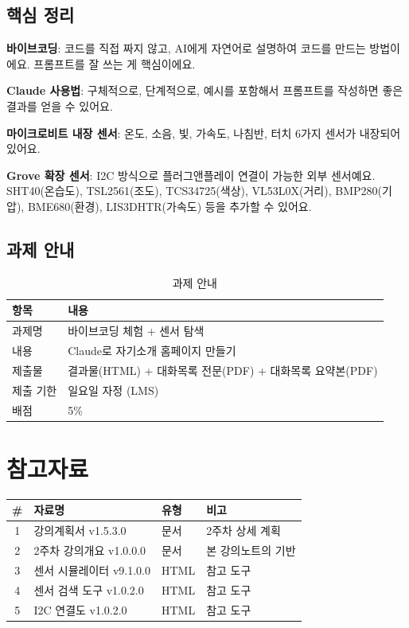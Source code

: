 \documentclass[11pt, a4paper]{article}
\begin{document}
\subsection{핵심 정리}

\textbf{바이브코딩}: 코드를 직접 짜지 않고, AI에게 자연어로 설명하여 코드를 만드는 방법이에요. 프롬프트를 잘 쓰는 게 핵심이에요.

\textbf{Claude 사용법}: 구체적으로, 단계적으로, 예시를 포함해서 프롬프트를 작성하면 좋은 결과를 얻을 수 있어요.

\textbf{마이크로비트 내장 센서}: 온도, 소음, 빛, 가속도, 나침반, 터치 6가지 센서가 내장되어 있어요.

\textbf{Grove 확장 센서}: I2C 방식으로 플러그앤플레이 연결이 가능한 외부 센서예요. SHT40(온습도), TSL2561(조도), TCS34725(색상), VL53L0X(거리), BMP280(기압), BME680(환경), LIS3DHTR(가속도) 등을 추가할 수 있어요.

\subsection{과제 안내}

\begin{table}[H]\centering
\caption{과제 안내}
\begin{tabular}{ll}\toprule
\textbf{항목} & \textbf{내용} \\\midrule
과제명 & 바이브코딩 체험 + 센서 탐색 \\
내용 & Claude로 자기소개 홈페이지 만들기 \\
제출물 & 결과물(HTML) + 대화목록 전문(PDF) + 대화목록 요약본(PDF) \\
제출 기한 & 일요일 자정 (LMS) \\
배점 & 5\% \\
\bottomrule
\end{tabular}
\end{table}

\section*{참고자료}

\begin{table}[H]\centering
\begin{tabular}{clll}\toprule
\textbf{\#} & \textbf{자료명} & \textbf{유형} & \textbf{비고} \\\midrule
1 & 강의계획서 v1.5.3.0 & 문서 & 2주차 상세 계획 \\
2 & 2주차 강의개요 v1.0.0.0 & 문서 & 본 강의노트의 기반 \\
3 & 센서 시뮬레이터 v9.1.0.0 & HTML & 참고 도구 \\
4 & 센서 검색 도구 v1.0.2.0 & HTML & 참고 도구 \\
5 & I2C 연결도 v1.0.2.0 & HTML & 참고 도구 \\
\bottomrule
\end{tabular}
\end{table}
\end{document}
